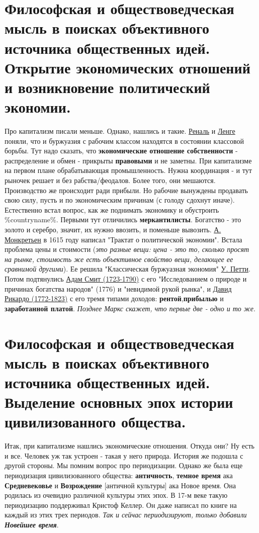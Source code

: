 \section{Философская и обществоведческая мысль в поисках объективного источника общественных идей. Открытие экономических отношений и возникновение политический экономии.}
Про капитализм писали меньше. Однако, нашлись и такие. \underline{Реналь} и \underline{Ленге} поняли, что и буржуазия с рабочим классом находятся в состоянии классовой борьбы. Тут надо сказать, что \textbf{экономические отношение собственности} - распределение и обмен - прикрыты \textbf{правовыми} и не заметны. При капитализме на первом плане обрабатывающая промышленность. Нужна координация - и тут рыночек решает и без рабства/феодалов. Более того, они мешаются. Производство же происходит ради прибыли. Но рабочие вынуждены продавать свою силу, пусть и по экономическим причинам (с голоду сдохнут иначе). Естественно встал вопрос, как же поднимать экономику и обустроить \%countryname\%. Первыми тут отличились \textbf{меркантилисты}. Богатство - это золото и серебро, значит, их нужно ввозить, и поменьше вывозить. \underline{А. Монкретьен} в 1615 году написал "Трактат о политической экономии". Встала проблема цены и стоимости (\textit{это разные вещи: цена - это то, сколько просят на рынке, стоимость же есть объективное свойство вещи, делающее ее сравнимой  другими}). Ее решила "Классическая буржуазная экономия" \underline{У. Петти}. Потом подтянулись \underline{Адам Смит (1723-1790)} с его "Исследованием о природе и причинах богатства народов" (1776) и "невидимой рукой рынка", и \underline{Давид Рикардо (1772-1823)} с его тремя типами доходов: \textbf{рентой},\textbf{прибылью} и \textbf{заработанной платой}. \textit{Позднее Маркс скажет, что первые две - одно и то же}.

\section{Философская и обществоведческая мысль в поисках объективного источника общественных идей. Выделение основных эпох истории цивилизованного общества.}
Итак, при капитализме нашлись экономические отношения. Откуда они? Ну есть и все. Человек уж так устроен - такая у него природа. История же подошла с другой стороны. Мы помним вопрос про периодизации. Однако же была еще периодизация цивилизованного общества: \textbf{античность}, \textbf{темное время} ака \textbf{Средневековье} и \textbf{Возрождение} [античной культуры] ака Новое время. Она родилась из очевидно различной культуры этих эпох. В 17-м веке такую периодизацию поддерживал Кристоф Келлер. Он даже написал по книге на каждый из этих трех периодов. \textit{Так и сейчас периодизируют, только добавили \textbf{Новейшее время}}.

